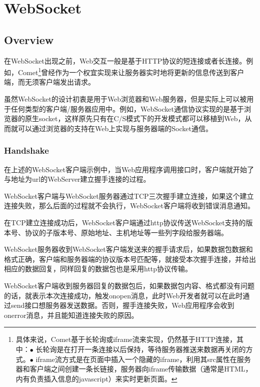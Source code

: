 \part{WebSocket}



\chapter{Overview}

在WebSocket出现之前，Web交互一般是基于HTTP协议的短连接或者长连接。例如，Comet\footnote{具体来说，Comet基于长轮询或iframe流来实现，仍然基于HTTP连接，其中：\newline $\bullet$ 长轮询是在打开一条连接以后保持，等待服务器推送来数据再关闭的方式。\newline $\bullet$ iframe流方式是在页面中插入一个隐藏的iframe，利用其src属性在服务器和客户端之间创建一条长链接，服务器向iframe传输数据（通常是HTML，内有负责插入信息的javascript）来实时更新页面。}曾经作为一个权宜实现来让服务器实时地将更新的信息传送到客户端，而无须客户端发出请求。



虽然WebSocket的设计初衷是用于Web浏览器和Web服务器，但是实际上可以被用于任何类型的客户端/服务器应用中。例如，WebSocket通信协议实现的是基于浏览器的原生socket，这样原先只有在C/S模式下的开发模式都可以移植到Web，从而就可以通过浏览器的支持在Web上实现与服务器端的Socket通信。


\section{Handshake}

在上述的WebSocket客户端示例中，当Web应用程序调用接口时，客户端就开始了与地址为url的WebServer建立握手连接的过程。


\begin{compactenum}
\item WebSocket客户端与WebSocket服务器通过TCP三次握手建立连接，如果这个建立连接失败，那么后面的过程就不会执行，WebSocket客户端将收到错误消息通知。

\item 在TCP建立连接成功后，WebSocket客户端通过http协议传送WebSocket支持的版本号、协议的子版本号、原始地址、主机地址等一些列字段给服务器端。

\item WebSocket服务器收到WebSocket客户端发送来的握手请求后，如果数据包数据和格式正确，客户端和服务器端的协议版本号匹配等，就接受本次握手连接，并给出相应的数据回复，同样回复的数据包也是采用http协议传输。

\item WebSocket客户端收到服务器回复的数据包后，如果数据包内容、格式都没有问题的话，就表示本次连接成功，触发onopen消息，此时Web开发者就可以在此时通过send接口想服务器发送数据。否则，握手连接失败，Web应用程序会收到onerror消息，并且能知道连接失败的原因。


\end{compactenum}




